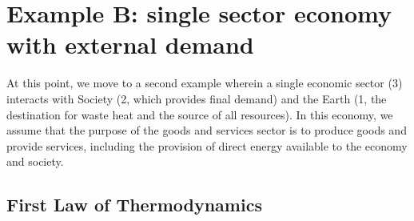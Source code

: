 %
%
%
\chapter{Example B: single sector economy with external demand}
\label{chap:single_sector_ext_demand} %





At this point, we move to a second example wherein a single economic sector (3) interacts with Society (2, which provides final demand) and the Earth (1, the destination for waste heat and the source of all resources). In this economy, we assume that the purpose of the goods and services sector is to produce goods and provide services, including the provision of direct energy available to the economy and society.

\section{First Law of Thermodynamics}

